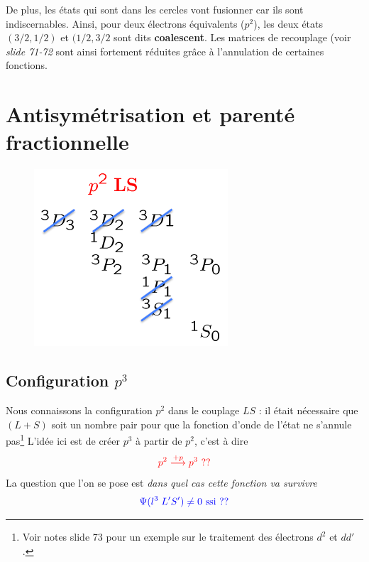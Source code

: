 De plus, les états qui sont dans les cercles vont fusionner car ils sont indiscernables. 
Ainsi, pour deux électrons équivalents ($p^2$), les deux états $(3/2,1/2)$ et $(1/2,3/2$ sont
dits \textbf{coalescent}. Les matrices de recouplage (voir \textit{slide 71-72} sont ainsi
fortement réduites grâce à l'annulation de certaines fonctions.

\section{Antisymétrisation et parenté fractionnelle}

	\begin{figure}
	\vspace{-5mm}
	\includegraphics[scale=0.5]{ch1/image14}
	\end{figure}
	
\subsection{Configuration $p^3$}	
Nous connaissons la configuration $p^2$ dans le couplage $LS$ : il était nécessaire que
$(L+S)$ soit un nombre pair pour que la fonction d'onde de l'état ne s'annule pas\footnote{Voir
notes slide 73 pour un exemple sur le traitement des électrons $d^2$ et $dd'$.} L'idée ici est
de créer $p^3$ à partir de $p^2$, c'est à dire
\begin{equation}
{\color{red}  p^2
\stackrel{+p}{\longrightarrow}
p^3 ~?? }
\end{equation}
La question que l'on se pose est \textit{dans quel cas cette fonction va survivre}
\begin{equation}
{\color{blue} \Psi (l^3 \; L'S') \ne 0 ~\mbox{ssi~??}  }
\end{equation}

